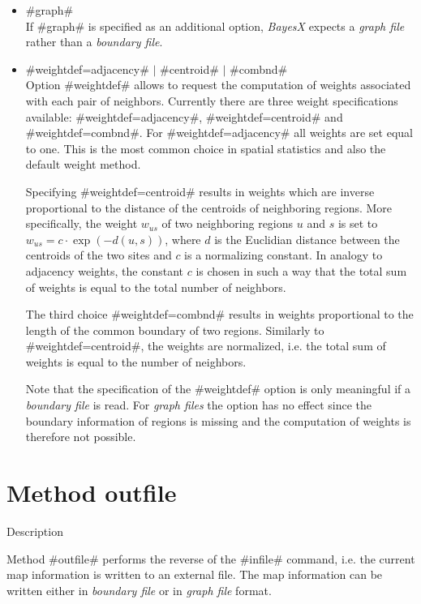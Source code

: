 \begin{itemize}
\item #graph# \\
If #graph# is specified as an additional option, {\em BayesX}
expects a {\em graph file} rather than a {\em boundary file}.
\item #weightdef=adjacency# $|$ #centroid#  $|$ #combnd# \\
\label{weightsmap} Option #weightdef# allows to request the
computation of weights associated with each pair of neighbors.
Currently there are three weight specifications available:
#weightdef=adjacency#, #weightdef=centroid# and
#weightdef=combnd#. For #weightdef=adjacency# all weights are set
equal to one. This is the most common choice in spatial statistics
and also the default weight method.

Specifying #weightdef=centroid# results in weights which are
inverse proportional to the distance of the centroids of
neighboring regions. More specifically, the weight $w_{us}$ of two
neighboring regions $u$ and $s$ is set to $w_{us} = c \cdot
\exp(-d(u,s))$, where $d$ is the Euclidian distance between the
centroids of the two sites and $c$ is a normalizing constant. In
analogy to adjacency weights, the constant $c$ is chosen in such a
way that the total sum of weights is equal to the total number of
neighbors.

The third choice #weightdef=combnd# results in weights
proportional to the length of the common boundary of two regions.
Similarly to #weightdef=centroid#, the weights are normalized,
i.e. the total sum of weights is equal to the number of neighbors.

Note that the specification of the #weightdef# option is only
meaningful if a {\em boundary file} is read. For {\em graph files}
the option has no effect since the boundary information of regions
is missing and the computation of weights is therefore not
possible.
\end{itemize}



\clearpage



\section{Method outfile}
\label{mapoutfile} 

\begin{stanza}{Description}

Method #outfile# performs the reverse of the #infile# command,
i.e. the current map information is written to an external file.
The map information can be written either in {\em boundary file}
or in {\em graph file} format.
\end{stanza}

